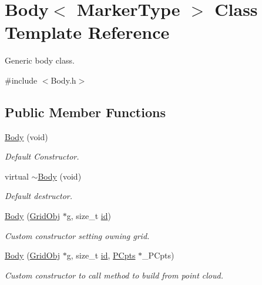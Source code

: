 \hypertarget{class_body}{}\section{Body$<$ Marker\+Type $>$ Class Template Reference}
\label{class_body}


Generic body class.  




{\ttfamily \#include $<$Body.\+h$>$}

\subsection*{Public Member Functions}
\begin{DoxyCompactItemize}
\item 
\hyperlink{class_body_a684a431c9215429149f36949ab007353}{Body} (void)
\begin{DoxyCompactList}\small\item\em Default Constructor. \end{DoxyCompactList}\item 
virtual \hyperlink{class_body_a62fb64b91f20eeef2d454994bdbc8b37}{$\sim$\+Body} (void)
\begin{DoxyCompactList}\small\item\em Default destructor. \end{DoxyCompactList}\item 
\hyperlink{class_body_a5b5eaa43a6dcf5e3fdd996c126aa21ea}{Body} (\hyperlink{class_grid_obj}{Grid\+Obj} $\ast$g, size\+\_\+t \hyperlink{class_body_a9d5166d7419f303190b6c6543e67e815}{id})
\begin{DoxyCompactList}\small\item\em Custom constructor setting owning grid. \end{DoxyCompactList}\item 
\hyperlink{class_body_a4676f710995ea5834c6dfde4f54e9067}{Body} (\hyperlink{class_grid_obj}{Grid\+Obj} $\ast$g, size\+\_\+t \hyperlink{class_body_a9d5166d7419f303190b6c6543e67e815}{id}, \hyperlink{class_p_cpts}{P\+Cpts} $\ast$\+\_\+\+P\+Cpts)
\begin{DoxyCompactList}\small\item\em Custom constructor to call method to build from point cloud. \end{DoxyCompactList}\end{DoxyCompactItemize}
